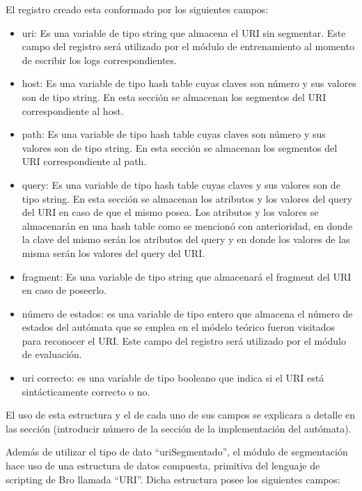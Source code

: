 El registro creado esta conformado por los siguientes campos:
\begin{itemize}
\item uri: Es una variable de tipo string que almacena el URI sin segmentar. Este campo del registro será utilizado por el módulo de entrenamiento al momento de escribir los logs correspondientes.
\item host: Es una variable de tipo hash table cuyas claves son número y sus valores  son de tipo string. En esta sección se almacenan los segmentos del URI correspondiente al host.
\item path: Es una variable de tipo hash table cuyas claves son número y sus valores  son de tipo string. En esta sección se almacenan los segmentos del URI correspondiente al path.
\item query: Es una variable de tipo hash table cuyas claves y sus valores son de tipo string. En esta sección se almacenan los atributos y los valores del query del URI en caso de que el mismo posea. Los atributos y los valores se almacenarán en una hash table como se mencionó con anterioridad, en donde la clave del mismo serán los atributos del query y en donde los valores de las misma serán los valores del query del URI.
\item fragment: Es una variable de tipo string que almacenará el fragment del URI en caso de poseerlo.
\item número de estados: es una variable de tipo entero que almacena el número de estados del autómata que se emplea en el módelo teórico fueron visitados para reconocer el URI. Este campo del registro será utilizado por el módulo de evaluación.
\item uri correcto: es una variable de tipo booleano que indica si el URI está sintácticamente correcto o no.
\end{itemize}

El uso de esta estructura y el de cada uno de sus campos se explicara a detalle en las sección (introducir número de la sección de la implementación del autómata).

Además de utilizar el tipo de dato “uriSegmentado”, el módulo de segmentación hace uso de una estructura de datos compuesta, primitiva del lenguaje de scripting de Bro llamada  “URI”. Dicha estructura posee los siguientes campos:

